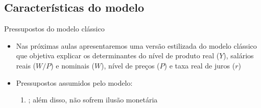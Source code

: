 \documentclass[10pt]{beamer}
\begin{document}
\subsection{Características do modelo}
\begin{frame}{Pressupostos do modelo clássico}
    \begin{itemize}
        \item Nas próximas aulas apresentaremos uma versão estilizada do modelo clássico que objetiva explicar os determinantes do nível de produto real ($Y$), salários reais ($W/P$) e nominais ($W$), nível de preços ($P$) e taxa real de juros ($r$)\bigskip

        \item Pressupostos assumidos pelo modelo:\medskip
              \begin{enumerate}
                  \item {}; além disso, não sofrem ilusão monetária\medskip


\end{enumerate}
\end{itemize}
\end{frame}
\end{document}
